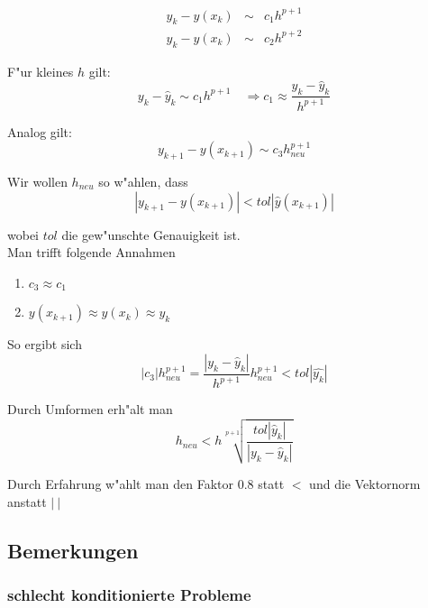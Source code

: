 \documentclass[german, 10pt, a4paper, twocolumn]{scrartcl}
\theoremstyle{definition}
\begin{document}
\begin{eqnarray*}
	y_k - y(x_k) &		\sim &		c_1 h^{p+1}\\
	\hat{y}_k - y(x_k) &	\sim &		c_2 h^{p+2}
\end{eqnarray*}

F"ur kleines $h$ gilt:
\begin{displaymath}
	y_k - \hat{y}_k \sim c_1 h^{p+1} \quad \Rightarrow c_1 \approx \frac{y_k - \hat{y}_k}{h^{p+1}}
\end{displaymath}

Analog gilt:
\begin{displaymath}
	y_{k+1} - y(x_{k+1}) \sim c_3 h^{p+1}_{neu}
\end{displaymath}

Wir wollen $h_{neu}$ so w"ahlen, dass
\begin{displaymath}
	| y_{k+1} - y(x_{k+1}) | < tol |\hat{y}(x_{k+1})|
\end{displaymath}

wobei $tol$ die gew"unschte Genauigkeit ist.\\

Man trifft folgende Annahmen
\begin{enumerate}
	\item $c_3 \approx c_1$
	\item $y(x_{k+1}) \approx y(x_k) \approx y_k$
\end{enumerate}

So ergibt sich
\begin{displaymath}
	|c_3 | h_{neu}^{p+1} = \frac{|y_k - \hat{y}_k|}{h^{p+1}} h_{neu}^{p+1} < tol |\hat{y_{k}}|
\end{displaymath}

Durch Umformen erh"alt man
\begin{displaymath}
	h_{neu} < h \sqrt[p+1]{\frac{tol | \hat{y}_k |}{|y_k - \hat{y}_k|}}
\end{displaymath}

Durch Erfahrung w"ahlt man den Faktor $0.8$ statt $<$ und die Vektornorm anstatt $|\ |$


\subsection{Bemerkungen}

\subsubsection{schlecht konditionierte Probleme}
\end{document}
